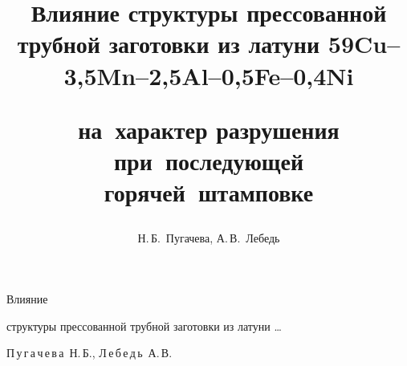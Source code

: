 %






%

%

%



\renewcommand{\firstpage}{180}

\renewcommand{\lastpage}{187}







\title{Влияние структуры прессованной трубной заготовки из латуни 59Cu--3,5Mn--2,5Al--0,5Fe--0,4Ni

на~характер разрушения при~последующей горячей~штамповке} {Влияние

структуры прессованной трубной заготовки из латуни \dots}



\author{Н.\,Б.~Пугачева, А.\,В.~Лебедь}

{П\,у\,г\,а\,ч\,е\,в\,а~Н.\,Б., Л\,е\,б\,е\,д\,ь~А.\,В.}












